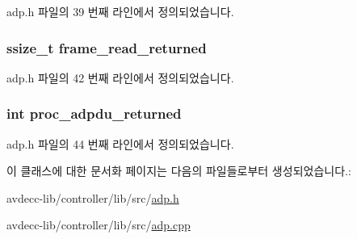 adp.\+h 파일의 39 번째 라인에서 정의되었습니다.

\subsubsection[{\texorpdfstring{frame\+\_\+read\+\_\+returned}{frame_read_returned}}]{\setlength{\rightskip}{0pt plus 5cm}ssize\+\_\+t frame\+\_\+read\+\_\+returned\hspace{0.3cm}{\ttfamily [private]}}\hypertarget{classavdecc__lib_1_1adp_aed50457ad7f69e25200d9bd577bdb05f}{}\label{classavdecc__lib_1_1adp_aed50457ad7f69e25200d9bd577bdb05f}


adp.\+h 파일의 42 번째 라인에서 정의되었습니다.

\subsubsection[{\texorpdfstring{proc\+\_\+adpdu\+\_\+returned}{proc_adpdu_returned}}]{\setlength{\rightskip}{0pt plus 5cm}int proc\+\_\+adpdu\+\_\+returned\hspace{0.3cm}{\ttfamily [private]}}\hypertarget{classavdecc__lib_1_1adp_a8b55e1a3a594d836a9a547d6a35523a1}{}\label{classavdecc__lib_1_1adp_a8b55e1a3a594d836a9a547d6a35523a1}


adp.\+h 파일의 44 번째 라인에서 정의되었습니다.



이 클래스에 대한 문서화 페이지는 다음의 파일들로부터 생성되었습니다.\+:\begin{DoxyCompactItemize}
\item 
avdecc-\/lib/controller/lib/src/\hyperlink{adp_8h}{adp.\+h}\item 
avdecc-\/lib/controller/lib/src/\hyperlink{adp_8cpp}{adp.\+cpp}\end{DoxyCompactItemize}
